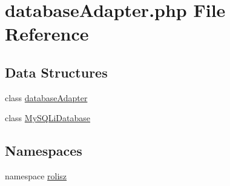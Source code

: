 \hypertarget{database_adapter_8php}{
\section{databaseAdapter.php File Reference}
\label{database_adapter_8php}
}
\subsection*{Data Structures}
\begin{DoxyCompactItemize}
\item 
class \hyperlink{interfacedatabase_adapter}{databaseAdapter}
\item 
class \hyperlink{class_my_s_q_li_database}{MySQLiDatabase}
\end{DoxyCompactItemize}
\subsection*{Namespaces}
\begin{DoxyCompactItemize}
\item 
namespace \hyperlink{namespacerolisz}{rolisz}
\end{DoxyCompactItemize}

